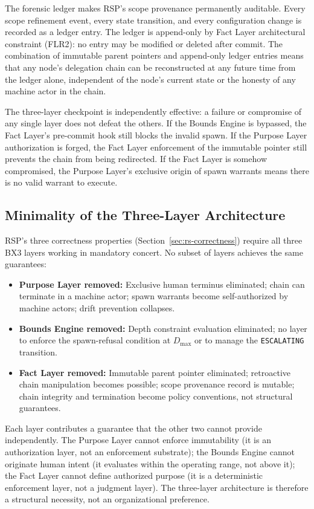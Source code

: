 The forensic ledger makes RSP's scope provenance permanently auditable. Every scope refinement event, every state transition, and every configuration change is recorded as a ledger entry. The ledger is append-only by Fact Layer architectural constraint (FLR2): no entry may be modified or deleted after commit. The combination of immutable parent pointers and append-only ledger entries means that any node's delegation chain can be reconstructed at any future time from the ledger alone, independent of the node's current state or the honesty of any machine actor in the chain.

The three-layer checkpoint is independently effective: a failure or compromise of any single layer does not defeat the others. If the Bounds Engine is bypassed, the Fact Layer's pre-commit hook still blocks the invalid spawn. If the Purpose Layer authorization is forged, the Fact Layer enforcement of the immutable pointer still prevents the chain from being redirected. If the Fact Layer is somehow compromised, the Purpose Layer's exclusive origin of spawn warrants means there is no valid warrant to execute.

\subsection{Minimality of the Three-Layer Architecture}
\label{sec:rs-layer-minimality}

RSP's three correctness properties (Section~\ref{sec:rs-correctness}) require all three BX3 layers working in mandatory concert. No subset of layers achieves the same guarantees:

\begin{itemize}
    \item \textbf{Purpose Layer removed:} Exclusive human terminus eliminated; chain can terminate in a machine actor; spawn warrants become self-authorized by machine actors; drift prevention collapses.
    \item \textbf{Bounds Engine removed:} Depth constraint evaluation eliminated; no layer to enforce the spawn-refusal condition at $D_{\max}$ or to manage the \texttt{ESCALATING} transition.
    \item \textbf{Fact Layer removed:} Immutable parent pointer eliminated; retroactive chain manipulation becomes possible; scope provenance record is mutable; chain integrity and termination become policy conventions, not structural guarantees.
\end{itemize}

Each layer contributes a guarantee that the other two cannot provide independently. The Purpose Layer cannot enforce immutability (it is an authorization layer, not an enforcement substrate); the Bounds Engine cannot originate human intent (it evaluates within the operating range, not above it); the Fact Layer cannot define authorized purpose (it is a deterministic enforcement layer, not a judgment layer). The three-layer architecture is therefore a structural necessity, not an organizational preference.